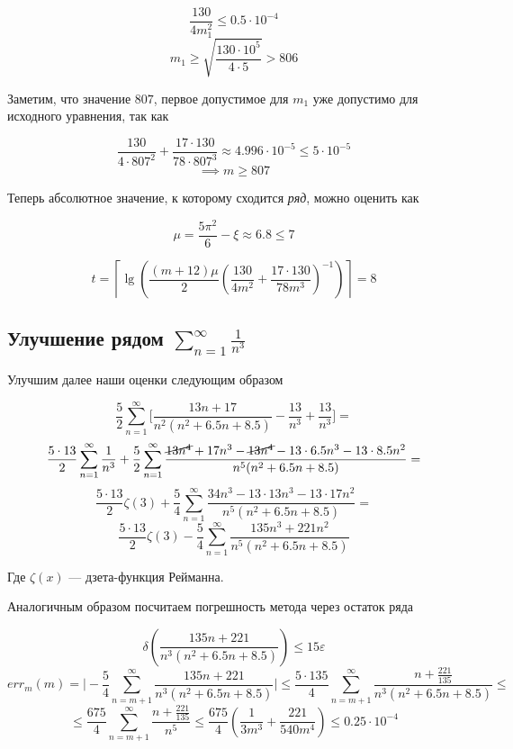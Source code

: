 \documentclass[11pt,a4paper,oneside]{article}
\begin{document}
$$ \frac{130}{4m_1^2} \le 0.5 \cdot 10^{-4} $$
$$ m_1 \ge \sqrt{\frac{130 \cdot 10^5}{4 \cdot 5}} > 806 $$

Заметим, что значение $807$, первое допустимое для $m_1$ уже допустимо для исходного уравнения, так как

$$ \frac{130}{4 \cdot 807^2} + \frac{17 \cdot 130}{78 \cdot 807^3} \approx 4.996 \cdot 10^{-5}
	\le 5 \cdot 10^{-5} $$
$$ \implies m \ge 807 $$

Теперь абсолютное значение, к которому сходится \textit{ряд}, можно оценить как

$$ \mu = \frac{5 \pi^2}{6} - \xi \approx 6.8 \le 7 $$

$$ t = \left\lceil \lg\left(
	\frac{(m + 12) \mu}{2} \left(
		\frac{130}{4m^2} + \frac{17 \cdot 130}{78m^3} \right)^{-1} \right) \right\rceil = 8 $$
	
\subsection{Улучшение рядом $ \sum_{n = 1}^{\infty} \frac{1}{n^3} $}
	
Улучшим далее наши оценки следующим образом

$$ \frac{5}{2} \sum_{n = 1}^{\infty} \biggr[ \frac{13n + 17}{n^2 (n^2 + 6.5n + 8.5)} - 
	\frac{13}{n^3} + \frac{13}{n^3} \biggr] =$$
$$ \frac{5 \cdot 13}{2} \sum_{n = 1}^{\infty} \frac{1}{n^3} +
	\frac{5}{2} \sum_{n = 1}^{\infty}
	\frac{\cancel{13 n^4} + 17n^3 - \cancel{13 n^4} -
	13 \cdot 6.5 n^3 - 13 \cdot 8.5 n^2}{n^5 (n^2 + 6.5n + 8.5)} = $$
$$ \frac{5 \cdot 13}{2} \zeta(3) +
	\frac{5}{4} \sum_{n = 1}^{\infty}
	\frac{34 n^3 -
	13 \cdot 13 n^3 - 13 \cdot 17 n^2}{n^5 (n^2 + 6.5n + 8.5)} = $$
$$ \frac{5 \cdot 13}{2} \zeta(3) -
	\frac{5}{4} \sum_{n = 1}^{\infty}
	\frac{135 n^3 + 221 n^2}{n^5 (n^2 + 6.5n + 8.5)}$$
	
Где $\zeta(x)$ --- дзета-функция Рейманна.
	
Аналогичным образом посчитаем погрешность метода через остаток ряда

$$ \delta\left( \frac{135 n + 221}{n^3 (n^2 + 6.5n + 8.5)} \right) \le 15 \varepsilon $$
$$ err_{m}(m) = \biggr| - \frac{5}{4} \sum_{n = m + 1}^{\infty}
		\frac{135 n + 221}{n^3 (n^2 + 6.5n + 8.5)} \biggr|
	\le \frac{5 \cdot 135}{4} \sum_{n = m + 1}^{\infty}
		\frac{n + \frac{221}{135}}{n^3 (n^2 + 6.5n + 8.5)} \le $$
$$ \le \frac{675}{4} \sum_{n = m + 1}^{\infty}
		\frac{n + \frac{221}{135}}{n^5}
	\le \frac{675}{4} \left( \frac{1}{3 m^3} + \frac{221}{540 m^4} \right) \le 0.25 \cdot 10^{-4} $$
	
\end{document}
